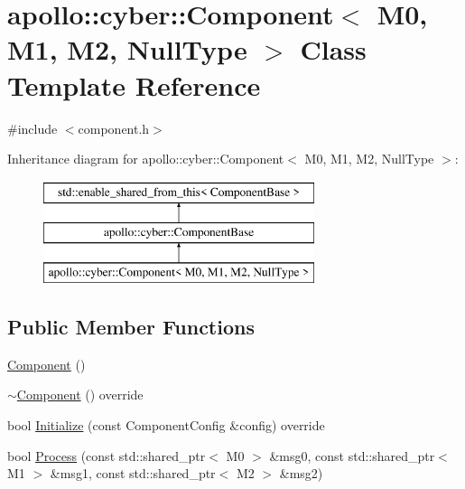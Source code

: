 \hypertarget{classapollo_1_1cyber_1_1Component_3_01M0_00_01M1_00_01M2_00_01NullType_01_4}{\section{apollo\-:\-:cyber\-:\-:Component$<$ M0, M1, M2, Null\-Type $>$ Class Template Reference}
\label{classapollo_1_1cyber_1_1Component_3_01M0_00_01M1_00_01M2_00_01NullType_01_4}
}


{\ttfamily \#include $<$component.\-h$>$}

Inheritance diagram for apollo\-:\-:cyber\-:\-:Component$<$ M0, M1, M2, Null\-Type $>$\-:\begin{figure}[H]
\begin{center}
\leavevmode
\includegraphics[height=3.000000cm]{classapollo_1_1cyber_1_1Component_3_01M0_00_01M1_00_01M2_00_01NullType_01_4}
\end{center}
\end{figure}
\subsection*{Public Member Functions}
\begin{DoxyCompactItemize}
\item 
\hyperlink{classapollo_1_1cyber_1_1Component_3_01M0_00_01M1_00_01M2_00_01NullType_01_4_a4f364f7e6d63005932bec12e055c9387}{Component} ()
\item 
\hyperlink{classapollo_1_1cyber_1_1Component_3_01M0_00_01M1_00_01M2_00_01NullType_01_4_a44914b8640994ffc0fd2c5618a88ea44}{$\sim$\-Component} () override
\item 
bool \hyperlink{classapollo_1_1cyber_1_1Component_3_01M0_00_01M1_00_01M2_00_01NullType_01_4_ae890450f0eb587c8ea7fbfa91259876a}{Initialize} (const Component\-Config \&config) override
\item 
bool \hyperlink{classapollo_1_1cyber_1_1Component_3_01M0_00_01M1_00_01M2_00_01NullType_01_4_a0eaa3a774441dc451576e4c369b48139}{Process} (const std\-::shared\-\_\-ptr$<$ M0 $>$ \&msg0, const std\-::shared\-\_\-ptr$<$ M1 $>$ \&msg1, const std\-::shared\-\_\-ptr$<$ M2 $>$ \&msg2)
\end{DoxyCompactItemize}
